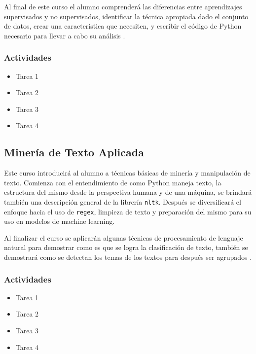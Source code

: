 \documentclass{article}
\begin{document}
            Al final de este curso el alumno comprenderá las diferencias entre aprendizajes supervisados y no supervisados, identificar la técnica apropiada dado el conjunto de datos, crear una característica que necesiten, y escribir el código de Python necesario para llevar a cabo su análisis \cite{applied-ml}.

            \subsubsection{Actividades}

                \begin{itemize}
                    \item Tarea 1
                    \item Tarea 2
                    \item Tarea 3
                    \item Tarea 4
                \end{itemize}

        \subsection{Minería de Texto Aplicada}

            Este curso introducirá al alumno a técnicas básicas de minería y manipulación de texto. Comienza con el entendimiento de como Python maneja texto, la estructura del mismo desde la perspectiva humana y de una máquina, se brindará también una descripción general de la librería \texttt{nltk}. Después se diversificará el enfoque hacia el uso de \texttt{regex}, limpieza de texto y preparación del mismo para su uso en modelos de machine learning.

            Al finalizar el curso se aplicarán algunas técnicas de procesamiento de lenguaje natural para demostrar como es que se logra la clasificación de texto, también se demostrará como se detectan los temas de los textos para después ser agrupados \cite{text-mining}.

            \subsubsection{Actividades}
                    
                \begin{itemize}
                    \item Tarea 1
                    \item Tarea 2
                    \item Tarea 3
                    \item Tarea 4
                \end{itemize}
\end{document}
